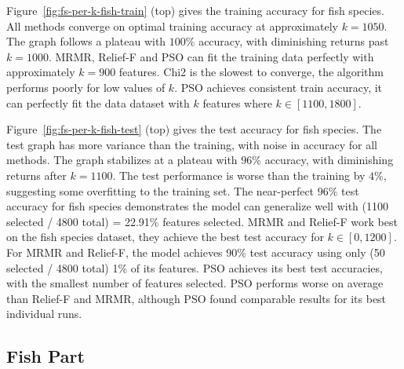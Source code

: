 \documentclass[runningheads]{llncs}
\begin{document}
Figure~\ref{fig:fs-per-k-fish-train} (top) gives the training accuracy for fish species. 
All methods converge on optimal training accuracy at approximately $k = 1050$. 
The graph follows a plateau with $100\%$ accuracy, with diminishing returns past $k = 1000$. 
MRMR, Relief-F and PSO can fit the training data perfectly with approximately $k = 900$ features.
Chi2 is the slowest to converge, the algorithm performs poorly for low values of $k$. 
PSO achieves consistent train accuracy, it can perfectly fit the data dataset with $k$ features where $k \in [1100,1800]$. 

Figure~\ref{fig:fs-per-k-fish-test} (top) gives the test accuracy for fish species. 
The test graph has more variance than the training, with noise in accuracy for all methods. 
The graph stabilizes at a plateau with $96\%$ accuracy, with diminishing returns after $k=1100$. 
The test performance is worse than the training by $4\%$, suggesting some overfitting to the training set. 
The near-perfect $96\%$ test accuracy for fish species demonstrates the model can generalize well with (1100 selected / 4800 total) = 22.91\% features selected.
MRMR and Relief-F work best on the fish species dataset, they achieve the best test accuracy for $k \in [0,1200]$.
For MRMR and Relief-F, the model achieves 90\% test accuracy using only (50 selected / 4800 total) 1\% of its features.
PSO achieves its best test accuracies, with the smallest number of features selected. 
PSO performs worse on average than Relief-F and MRMR, although PSO found comparable results for its best individual runs. 

\subsection{Fish Part}
\end{document}
